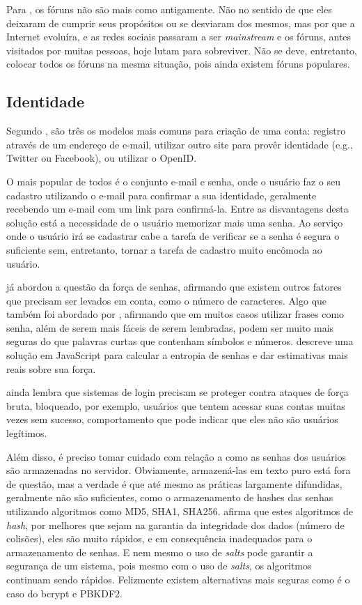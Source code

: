\documentclass[diss]{template/setrem}
\begin{document}
Para \citet{Heffernan2011}, os fóruns não são mais como antigamente. Não no sentido de que eles deixaram de cumprir seus propósitos ou se desviaram dos mesmos, mas por que a Internet evoluíra, e as redes sociais passaram a ser \emph{mainstream} e os fóruns, antes visitados por muitas pessoas, hoje lutam para sobreviver. Não se deve, entretanto, colocar todos os fóruns na mesma situação, pois ainda existem fóruns populares.

\subsection{Identidade}
Segundo \citet{Bell2009}, são três os modelos mais comuns para criação de uma conta: registro através de um endereço de e-mail, utilizar outro site para provêr identidade (e.g., Twitter ou Facebook), ou utilizar o OpenID.

O mais popular de todos é o conjunto e-mail e senha, onde o usuário faz o seu cadastro utilizando o e-mail para confirmar a sua identidade, geralmente recebendo um e-mail com um link para confirmá-la. Entre as disvantagens desta solução está a necessidade de o usuário memorizar mais uma senha. Ao serviço onde o usuário irá se cadastrar cabe a tarefa de verificar se a senha é segura o suficiente sem, entretanto, tornar a tarefa de cadastro muito encômoda ao usuário.

\citet{xkcd2011} já abordou a questão da força de senhas, afirmando que existem outros fatores que precisam ser levados em conta, como o número de caracteres. Algo que também foi abordado por \citet{Atwood2006a}, afirmando que em muitos casos utilizar frases como senha, além de serem mais fáceis de serem lembradas, podem ser muito mais seguras do que palavras curtas que contenham símbolos e números. \citet{Wheeler2012} descreve uma solução em JavaScript para calcular a entropia de senhas e dar estimativas mais reais sobre sua força.

\citet{Bell2009} ainda lembra que sistemas de login precisam se proteger contra ataques de força bruta, bloqueado, por exemplo, usuários que tentem acessar suas contas muitas vezes sem sucesso, comportamento que pode indicar que eles não são usuários legítimos.

Além disso, é preciso tomar cuidado com relação a como as senhas dos usuários são armazenadas no servidor. Obviamente, armazená-las em texto puro está fora de questão, mas a verdade é que até mesmo as práticas largamente difundidas, geralmente não são suficientes, como o armazenamento de hashes das senhas utilizando algoritmos como MD5, SHA1, SHA256. \citet{Hale2010} afirma que estes algoritmos de \emph{hash}, por melhores que sejam na garantia da integridade dos dados (número de colisões), eles são muito rápidos, e em consequência inadequados para o armazenamento de senhas. E nem mesmo o uso de \emph{salts} pode garantir a segurança de um sistema, pois mesmo com o uso de \emph{salts}, os algoritmos continuam sendo rápidos. Felizmente existem alternativas mais seguras como é o caso do bcrypt e PBKDF2.
\end{document}
